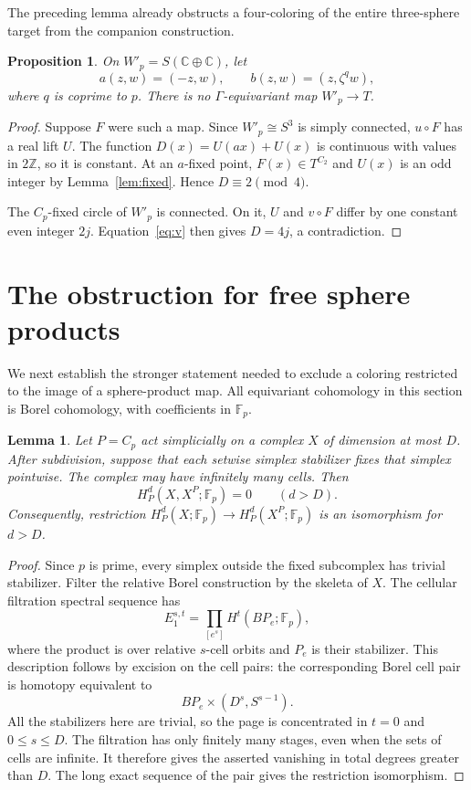 \documentclass[11pt]{amsart}
\newtheorem{proposition}[theorem]{Proposition}
\newtheorem{lemma}[theorem]{Lemma}
\theoremstyle{remark}
\numberwithin{equation}{section}
\newcommand{\C}{\mathbb C}
\newcommand{\Z}{\mathbb Z}
\newcommand{\F}{\mathbb F}
\begin{document}
The preceding lemma already obstructs a four-coloring of the entire three-sphere target from the companion construction.

\begin{proposition}\label{prop:full-target}
On $W'_p=S(\C\oplus\C)$, let
\[
 a(z,w)=(-z,w),\qquad b(z,w)=(z,\zeta^q w),
\]
where $q$ is coprime to $p$. There is no $\Gamma$-equivariant map $W'_p\to T$.
\end{proposition}
\begin{proof}
Suppose $F$ were such a map. Since $W'_p\cong S^3$ is simply connected, $u\circ F$ has a real lift $U$. The function $D(x)=U(ax)+U(x)$ is continuous with values in $2\Z$, so it is constant. At an $a$-fixed point, $F(x)\in T^{C_2}$ and $U(x)$ is an odd integer by Lemma~\ref{lem:fixed}. Hence $D\equiv2\pmod4$.

The $C_p$-fixed circle of $W'_p$ is connected. On it, $U$ and $v\circ F$ differ by one constant even integer $2j$. Equation~\eqref{eq:v} then gives $D=4j$, a contradiction.
\end{proof}

\section{The obstruction for free sphere products}\label{sec:borel}

We next establish the stronger statement needed to exclude a coloring restricted to the image of a sphere-product map. All equivariant cohomology in this section is Borel cohomology, with coefficients in $\F_p$.

\begin{lemma}\label{lem:borel}
Let $P=C_p$ act simplicially on a complex $X$ of dimension at most $D$. After subdivision, suppose that each setwise simplex stabilizer fixes that simplex pointwise. The complex may have infinitely many cells. Then
\[
 H_P^d(X,X^P;\F_p)=0\qquad(d>D).
\]
Consequently, restriction $H_P^d(X;\F_p)\to H_P^d(X^P;\F_p)$ is an isomorphism for $d>D$.
\end{lemma}
\begin{proof}
Since $p$ is prime, every simplex outside the fixed subcomplex has trivial stabilizer. Filter the relative Borel construction by the skeleta of $X$. The cellular filtration spectral sequence has
\[
 E_1^{s,t}=\prod_{[e^s]}H^t(BP_e;\F_p),
\]
where the product is over relative $s$-cell orbits and $P_e$ is their stabilizer. This description follows by excision on the cell pairs: the corresponding Borel cell pair is homotopy equivalent to
\[
 BP_e\times(D^s,S^{s-1}).
\]
All the stabilizers here are trivial, so the page is concentrated in $t=0$ and $0\leq s\leq D$. The filtration has only finitely many stages, even when the sets of cells are infinite. It therefore gives the asserted vanishing in total degrees greater than $D$. The long exact sequence of the pair gives the restriction isomorphism.
\end{proof}
\end{document}
